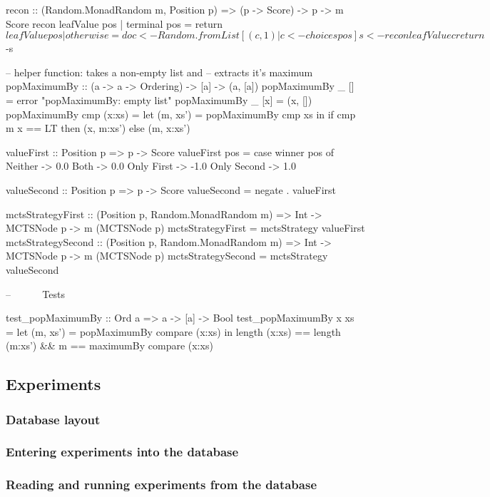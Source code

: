 \begin{code}
recon :: (Random.MonadRandom m, Position p) => (p -> Score) -> p -> m Score
recon leafValue pos
  | terminal pos = return $ leafValue pos
  | otherwise = do
      c <- Random.fromList [(c,1) | c <- choices pos]
      s <- recon leafValue c
      return $ -s

-- helper function: takes a non-empty list and
-- extracts it's maximum
popMaximumBy :: (a -> a -> Ordering) -> [a] -> (a, [a])
popMaximumBy _ [] = error "popMaximumBy: empty list"
popMaximumBy _ [x] = (x, [])
popMaximumBy cmp (x:xs) = 
  let (m, xs') = popMaximumBy cmp xs in
  if cmp m x == LT then (x, m:xs') else (m, x:xs')





valueFirst :: Position p => p -> Score
valueFirst pos =
  case winner pos of
    Neither -> 0.0
    Both -> 0.0
    Only First -> -1.0
    Only Second -> 1.0

valueSecond :: Position p =>  p -> Score
valueSecond = negate . valueFirst


mctsStrategyFirst :: (Position p, Random.MonadRandom m) =>
  Int -> MCTSNode p ->  m (MCTSNode p) 
mctsStrategyFirst = mctsStrategy valueFirst
mctsStrategySecond :: (Position p, Random.MonadRandom m) =>
  Int -> MCTSNode p ->  m (MCTSNode p)
mctsStrategySecond = mctsStrategy valueSecond




-- ~~~~~ Tests ~~~~~~~~~~~~~~~~~~~~~~~~~~~~



test_popMaximumBy :: Ord a => a -> [a] -> Bool
test_popMaximumBy x xs =
  let (m, xs') = popMaximumBy compare (x:xs) in
  length (x:xs) == length (m:xs') && m == maximumBy compare (x:xs)


\end{code}



\subsection {Experiments}

\subsubsection {Database layout}

\subsubsection {Entering experiments into the database}

\subsubsection {Reading and running experiments from the database}
